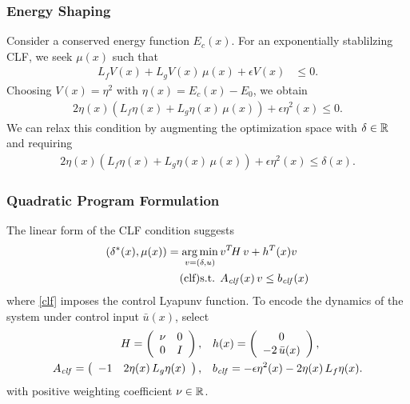 \begin{frame}
  \frametitle{Energy Shaping}
  Consider a conserved energy function $E_{c}(x)$. For an exponentially stablilzing CLF, we seek $\mu(x)$ such that
  \begin{align*}
    L_f V(x) + L_g V(x) \, \mu(x) + \epsilon V(x) &\leq 0.
  \end{align*}
  Choosing $V(x) = \eta^2$ with $\eta(x) = E_{c}(x) - E_{0}$, we obtain
  \begin{align*}
    2 \eta(x) \left(L_f \eta(x) + L_g \eta(x) \, \mu(x) \right) + \epsilon \eta^2(x) \leq 0.
  \end{align*}
  We can relax this condition by augmenting the optimization space with $\delta \in \mathbb{R}$ and requiring
  \begin{align*}
    2 \eta(x) \left(L_f \eta(x) + L_g \eta(x) \, \mu(x) \right) + \epsilon \eta^2(x) \leq \delta(x).
  \end{align*}
\end{frame}

\begin{frame}[t]
  \frametitle{Quadratic Program Formulation}
  The linear form of the CLF condition suggests
  \begin{align}
    \nonumber
    (\delta^*(x), \mu(x)) = \argmin_{v = (\delta, u)}  \, & v^T \! H \, v + h^T(x) v\\
    \label{clf} \tag{clf}
    \mbox{s.t. } & \Aclf(x) \, v \leq \bclf(x)%
  \end{align}
  where \eqref{clf} imposes the control Lyapunv function. To encode the dynamics of the system under control input ${\bar u}(x)$, select
  \begin{align*}
    H = \left(\begin{array}{c c}\nu & 0\\ 0 & I\end{array}\right), & \quad
      h(x) = \left(\begin{array}{c} 0\\ -2 \, \bar u(x) \end{array}\right),\\
      A_{\mathit{clf}} = \left(\begin{array}{c c}
        -1 & 2 \eta(x) \, L_{g} \eta(x)
      \end{array}\right), & \quad
      b_{\mathit{clf}} = -\epsilon \eta^{2}(x) - 2\eta(x) \, L_{f} \eta(x).
  \end{align*}
  with positive weighting coefficient $\nu \in \mathbb{R}$.
\end{frame}

